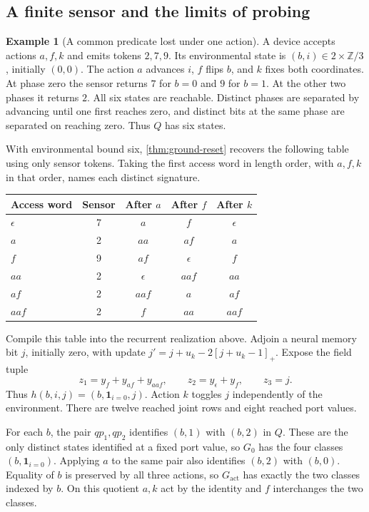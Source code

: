 \documentclass[11pt,a4paper]{article}
\theoremstyle{definition}
\newtheorem{example}[example]{Example}
\theoremstyle{remark}\newaliascnt{remark}{theorem}
\numberwithin{equation}{section}
\begin{document}
\subsection{A finite sensor and the limits of probing}
\begin{example}[A common predicate lost under one action]\label{ex:ground-pulse}
A device accepts actions $a,f,k$ and emits tokens $2,7,9$. Its environmental state is $(b,i)\in 2\times\mathbb Z/3$, initially $(0,0)$. The action $a$ advances $i$, $f$ flips $b$, and $k$ fixes both coordinates. At phase zero the sensor returns $7$ for $b=0$ and $9$ for $b=1$. At the other two phases it returns $2$. All six states are reachable. Distinct phases are separated by advancing until one first reaches zero, and distinct bits at the same phase are separated on reaching zero. Thus $Q$ has six states.

With environmental bound six, \cref{thm:ground-reset} recovers the following table using only sensor tokens. Taking the first access word in length order, with $a,f,k$ in that order, names each distinct signature.
\begin{center}
\begin{tabular}{@{}lcccc@{}}
\toprule
Access word & Sensor & After $a$ & After $f$ & After $k$\\
\midrule
$\epsilon$ & 7 & $a$ & $f$ & $\epsilon$\\
$a$        & 2 & $aa$ & $af$ & $a$\\
$f$        & 9 & $af$ & $\epsilon$ & $f$\\
$aa$       & 2 & $\epsilon$ & $aaf$ & $aa$\\
$af$       & 2 & $aaf$ & $a$ & $af$\\
$aaf$      & 2 & $f$ & $aa$ & $aaf$\\
\bottomrule
\end{tabular}
\end{center}
Compile this table into the recurrent realization above. Adjoin a neural memory bit $j$, initially zero, with update $j'=j+u_k-2[j+u_k-1]_+$. Expose the field tuple
\[
 z_1=y_f+y_{af}+y_{aaf},\qquad z_2=y_\epsilon+y_f,\qquad z_3=j.
\]
Thus $h(b,i,j)=(b,\mathbf1_{i=0},j)$. Action $k$ toggles $j$ independently of the environment. There are twelve reached joint rows and eight reached port values.

For each $b$, the pair $qp_1,qp_2$ identifies $(b,1)$ with $(b,2)$ in $Q$. These are the only distinct states identified at a fixed port value, so $G_0$ has the four classes $(b,\mathbf1_{i=0})$. Applying $a$ to the same pair also identifies $(b,2)$ with $(b,0)$. Equality of $b$ is preserved by all three actions, so $G_{\mathrm{act}}$ has exactly the two classes indexed by $b$. On this quotient $a,k$ act by the identity and $f$ interchanges the two classes.


\end{example}
\end{document}
